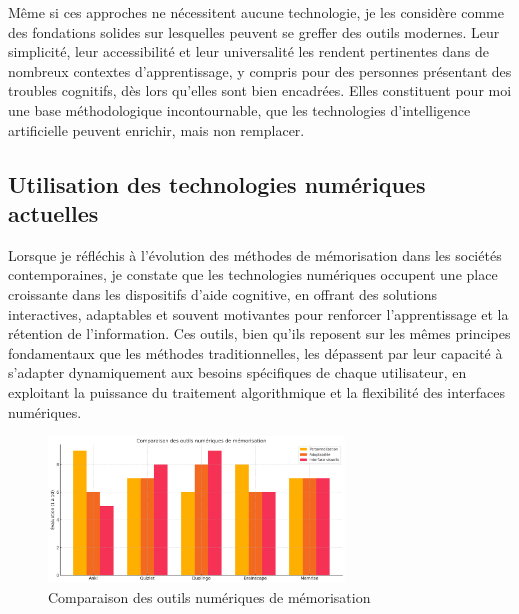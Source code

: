 \documentclass[11pt,a4paper]{report}
\begin{document}
Même si ces approches ne nécessitent aucune technologie, je les considère comme des fondations solides sur lesquelles peuvent se greffer des outils modernes. Leur simplicité, leur accessibilité et leur universalité les rendent pertinentes dans de nombreux contextes d’apprentissage, y compris pour des personnes présentant des troubles cognitifs, dès lors qu’elles sont bien encadrées. Elles constituent pour moi une base méthodologique incontournable, que les technologies d’intelligence artificielle peuvent enrichir, mais non remplacer.

\subsection{Utilisation des technologies numériques actuelles}

Lorsque je réfléchis à l’évolution des méthodes de mémorisation dans les sociétés contemporaines, je constate que les technologies numériques occupent une place croissante dans les dispositifs d’aide cognitive, en offrant des solutions interactives, adaptables et souvent motivantes pour renforcer l’apprentissage et la rétention de l’information. Ces outils, bien qu’ils reposent sur les mêmes principes fondamentaux que les méthodes traditionnelles, les dépassent par leur capacité à s’adapter dynamiquement aux besoins spécifiques de chaque utilisateur, en exploitant la puissance du traitement algorithmique et la flexibilité des interfaces numériques.

\begin{figure}[h]
    \centering
    \includegraphics[width=0.7\textwidth]{images/1.3.2.png}
    \caption{Comparaison des outils numériques de mémorisation}
    \label{fig:1.3.2}
\end{figure}
\end{document}
